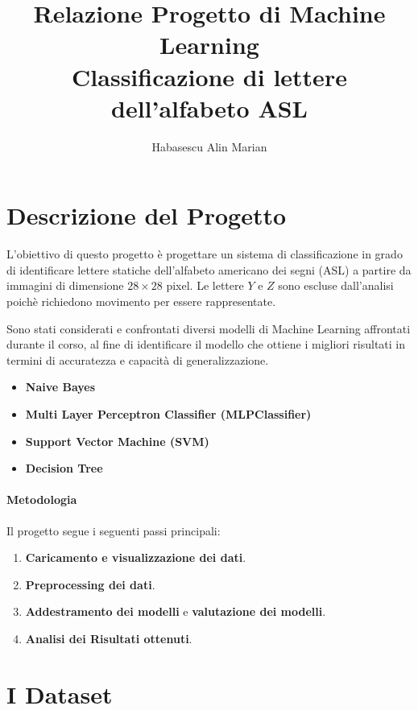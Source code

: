 \documentclass{article}
\title{Relazione Progetto di Machine Learning \\Classificazione di lettere dell'alfabeto ASL}
\author{Habasescu Alin Marian}
\begin{document}
\maketitle

\tableofcontents
\clearpage

\section{Descrizione del Progetto}

L'obiettivo di questo progetto è progettare un sistema di classificazione in 
grado di identificare lettere statiche dell'alfabeto americano dei segni (ASL) a partire da immagini 
di dimensione \(28\times28\) pixel. Le lettere \(Y\) e \(Z\) sono escluse dall'analisi poichè 
richiedono movimento per essere rappresentate. 

Sono stati considerati e confrontati diversi modelli di Machine Learning affrontati durante il corso, al fine 
di identificare il modello che ottiene i migliori risultati in termini di accuratezza e capacità di generalizzazione.

\begin{itemize}
    \item \textbf{Naive Bayes}
    
    \item \textbf{Multi Layer Perceptron Classifier (MLPClassifier)}
    
    \item \textbf{Support Vector Machine (SVM)}
    
    \item \textbf{Decision Tree}
\end{itemize}

\paragraph{Metodologia}
Il progetto segue i seguenti passi principali: 
\begin{enumerate}
    \item  \textbf{Caricamento e visualizzazione dei dati}.
    \item  \textbf{Preprocessing dei dati}.
    \item  \textbf{Addestramento dei modelli} e \textbf{valutazione dei modelli}.
    \item  \textbf{Analisi dei Risultati ottenuti}.
\end{enumerate}

\section{I Dataset}
\end{document}
